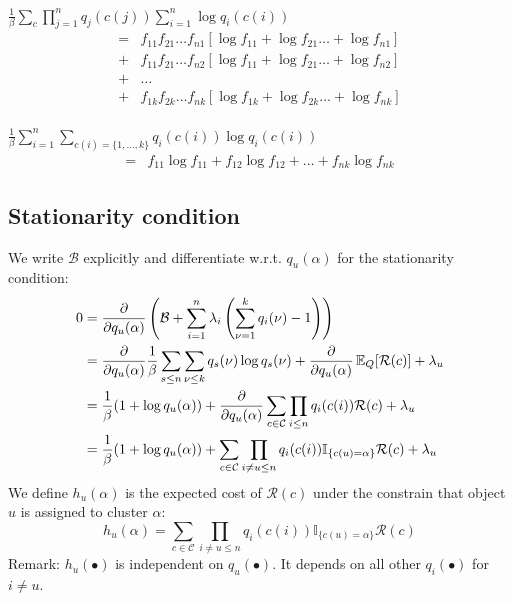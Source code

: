 \documentclass[12pt]{article}
\begin{document}
\ulb
\item $\frac{1}{\beta}\sum_c \prod_{j=1}^n q_j(c(j))\sum_{i=1}^n\log q_i(c(i))$
\begin{equation*}
\begin{split}
=&f_{11}f_{21}\dots f_{n1}[\log f_{11}+\log f_{21}\dots+\log f_{n1}]\\
+&f_{11}f_{21}\dots f_{n2}[\log f_{11}+\log f_{21}\dots+\log f_{n2}]\\
+&\dots \\
+&f_{1k}f_{2k}\dots f_{nk}[\log f_{1k}+\log f_{2k}\dots+\log f_{nk}]\\
\end{split}
\end{equation*}
\item $\frac{1}{\beta} \sum_{i=1}^n \sum_{c(i)=\{1,\dots,k\}} q_i(c(i)) \log q_i(c(i))$
\begin{equation*}
\begin{split}
=& f_{11}\log f_{11} + f_{12}\log f_{12} + \dots + f_{nk} \log f_{nk}
\end{split}
\end{equation*}
\ule

\subsection{Stationarity condition}
We write $\mathcal{B}$ explicitly and differentiate w.r.t. $q_u(\alpha)$ for the stationarity condition:
\begin{equation*}
\begin{split}
0 &= \frac{\partial}{\partial q_u(\alpha)} \left( \mathcal{B} + \sum_{i=1}^n \lambda_i \left( \sum_{\nu=1}^k q_i(\nu)-1 \right) \right) \\
&= \frac{\partial}{\partial q_u(\alpha)} \frac{1}{\beta} \sum_{s\leq n} \sum_{\nu\leq k} q_s(\nu) \log q_s(\nu) + \frac{\partial}{\partial q_u(\alpha)} \operatorname{\mathbb{E}}_Q [\mathcal{R}(c)] + \lambda_u \\
&= \frac{1}{\beta}(1+\log q_u(\alpha)) + \frac{\partial}{\partial q_u(\alpha)} \sum_{c\in\mathcal{C}} \prod_{i\leq n} q_i(c(i))\mathcal{R}(c) + \lambda_u \\
&= \frac{1}{\beta}(1+\log q_u(\alpha)) + \sum_{c\in\mathcal{C}} \prod_{i\neq u \leq n} q_i(c(i)) \mathbb{I}_{\{c(u)=\alpha \}} \mathcal{R}(c) + \lambda_u
\end{split}
\end{equation*}
We define $h_u(\alpha)$ is the expected cost of $\mathcal{R}(c)$ under the constrain that object $u$ is assigned to cluster $\alpha$:
\[ h_u(\alpha) = \sum_{c\in\mathcal{C}} \prod_{i\neq u \leq n} q_i(c(i)) \mathbb{I}_{\{c(u)=\alpha \}} \mathcal{R}(c) \]
Remark: $h_u(\bullet)$ is independent on $q_u(\bullet)$. It depends on all other $q_i(\bullet)$ for $i\neq u$.
\end{document}
